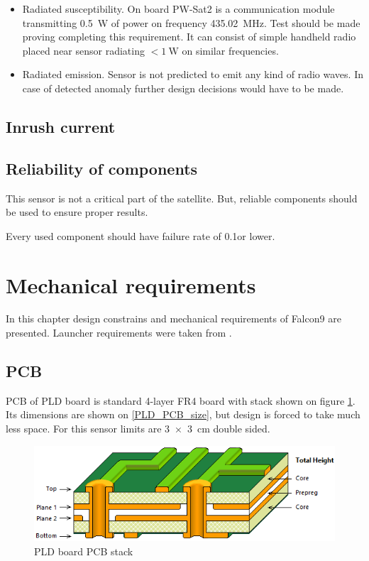 \begin{itemize}
		\item Radiated susceptibility.
			On board PW-Sat2 is a communication module transmitting \SI{0.5}{\watt} of power on frequency \SI{435.02}{\mega\hertz}. Test should be made proving completing this requirement. It can consist of simple handheld radio placed near sensor radiating $< \SI{1}{\watt}$ on similar frequencies.
			
		\item Radiated emission.
			Sensor is not predicted to emit any kind of radio waves. In case of detected anomaly further design decisions would have to be made.
		
	\end{itemize}


\subsection{Inrush current}

\subsection{Reliability of components}
	This sensor is not a critical part of the satellite. But, reliable components should be used to ensure proper results. 
	
	Every used component should have failure rate of 0.1\percent or lower.


\section{Mechanical requirements}
	In this chapter design constrains and mechanical requirements of Falcon9 are presented. Launcher requirements were taken from \cite{Falcon9_user_manual}.
	
\subsection{PCB}
\label{PCB_description}
	PCB of PLD board is standard 4-layer FR4 board with stack shown on figure \ref{PLD_PCB_stack}. Its dimensions are shown on \ref{PLD_PCB_size}, but design is forced to take much less space. For this sensor limits are \SI{3x3}{\centi\meter} double sided.

	\begin{figure}[H]
		\centering
		\includegraphics[width=0.5\paperwidth]{img/PLD_PCB_stack.png}
		\caption{PLD board PCB stack}
		\label{PLD_PCB_stack}
	\end{figure}	

